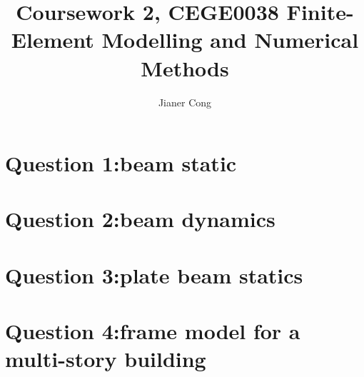 \documentclass[fleqn,10pt,dvipsnames]{olplainarticle}
\title{Coursework 2, CEGE0038 Finite-Element Modelling and Numerical Methods}
\author[1]{Jianer Cong}
\affil[1]{zcesjco@ucl.ac.uk}
\begin{document}
\maketitle


\section*{Question 1:beam static}\label{sec:p1}
% 
\section*{Question 2:beam dynamics}\label{sec:p2}
% 
\section*{Question 3:plate beam statics}\label{sec:p3}
% 
\section*{Question 4:frame model for a multi-story building}\label{sec:p4}

\end{document}
